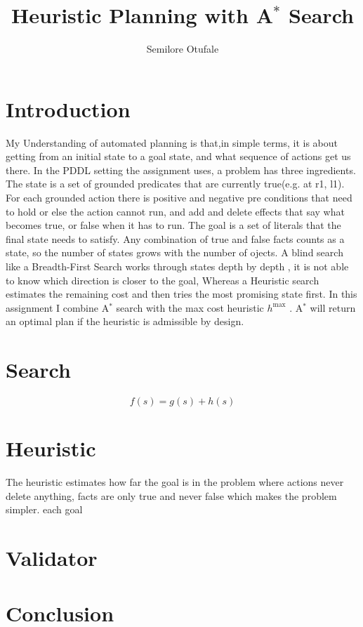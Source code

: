 \documentclass[letterpaper]{article}
\begin{document}
\title{Heuristic Planning with A$^*$ Search}
\author{Semilore Otufale}
\maketitle





\section{Introduction}
My Understanding of automated planning is that,in simple terms, it is about getting from an initial state to a goal state, and what sequence of actions get us there. In the PDDL setting the assignment uses, a problem has three ingredients. The state is a set of grounded predicates that are currently true(e.g.  at r1, l1). For each grounded action there is positive and negative pre conditions that need to hold or else the action cannot run, and add and delete effects that say what becomes true, or false when it has to run. The goal is a set of literals that the final state needs to satisfy. Any combination of true and false facts counts as a state, so the number of states grows with the number of ojects. A blind search like a Breadth-First Search  works through states depth by depth , it is not able to know which direction is closer to the goal, Whereas a Heuristic search estimates the remaining  cost and then tries the most promising state first. In this assignment I combine A$^*$ search with the max cost heuristic $h^{\max}$ \cite{bonet2001}. A$^*$ will return an optimal plan if the heuristic is admissible by design.

\section{Search}
\label{sec:search}
\begin{equation}
f(s) = g(s) + h(s)
\end{equation}


\section{Heuristic}
\label{sec:heuristic}
The heuristic estimates how far the goal is in the problem where actions never delete anything, facts are only true and never false which makes the problem simpler. each goal


\section{Validator}
\label{sec:validator}

\section{Conclusion}






\end{document}
